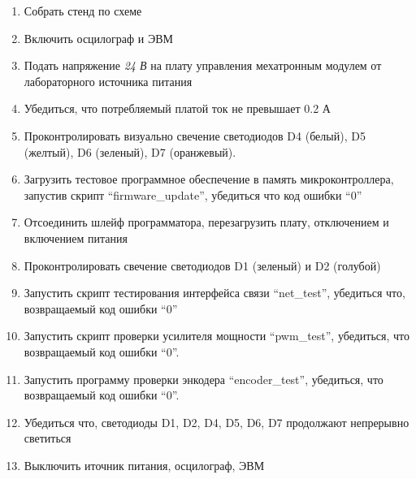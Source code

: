 \begin{enumerate}
    \item Собрать стенд по схеме
    \item Включить осцилограф и ЭВМ
    \item Подать напряжение \textit{24 В} на плату управления мехатронным
            модулем от лабораторного источника питания
    \item Убедиться, что потребляемый платой ток не превышает 0.2 А
    \item Проконтролировать визуально свечение светодиодов D4 (белый),
            D5 (желтый), D6 (зеленый), D7 (оранжевый).
    \item Загрузить тестовое программное обеспечение в память микроконтроллера,
            запустив скрипт ``firmware\_update'', убедиться что код ошибки ``0''
    \item Отсоединить шлейф программатора, перезагрузить плату, отключением и
            включением питания
    \item Проконтролировать свечение светодиодов D1 (зеленый) и D2 (голубой)
    \item Запустить скрипт тестирования интерфейса связи ``net\_test'',
            убедиться что, возвращаемый код ошибки ``0''
    \item Запустить скрипт проверки усилителя мощности ``pwm\_test'', убедиться,
            что возвращаемый код ошибки ``0''.
    \item Запустить программу проверки энкодера ``encoder\_test'', убедиться,
            что возвращаемый код ошибки ``0''.
    \item Убедиться что, светодиоды D1, D2, D4, D5, D6, D7 продолжают непрерывно
            светиться
    \item Выключить иточник питания, осцилограф, ЭВМ
\end{enumerate}
